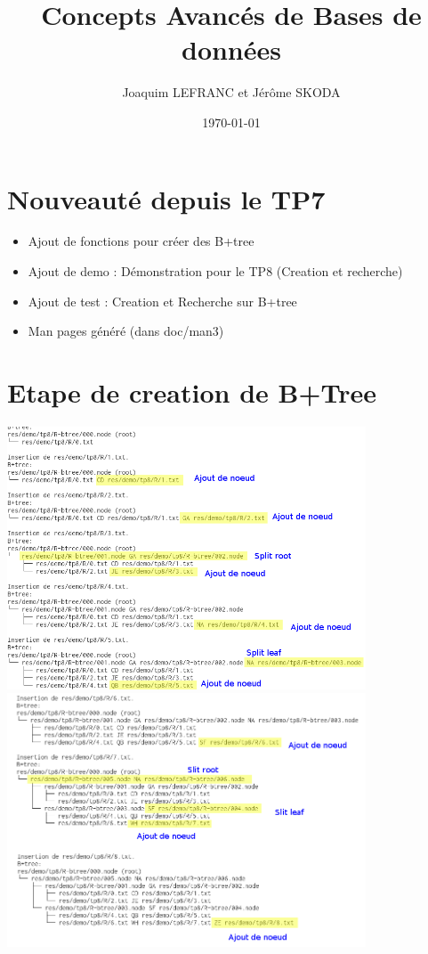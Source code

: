 \documentclass[a4paper]{article}
\title{Concepts Avancés de Bases de données}
\author{Joaquim LEFRANC et Jérôme SKODA}
\date{\today}
\begin{document}
\maketitle

\section{Nouveauté depuis le TP7}

\begin{itemize}
  \item Ajout de fonctions pour créer des B+tree
  \item Ajout de demo : Démonstration pour le TP8 (Creation et recherche)
  \item Ajout de test : Creation et Recherche sur B+tree
  \item Man pages généré (dans doc/man3)
\end{itemize}

\section{Etape de creation de B+Tree}

\includegraphics[width=0.8\textwidth]{btree-1.png}
\newline
\includegraphics[width=0.8\textwidth]{btree-2.png}
\newline
\end{document}

